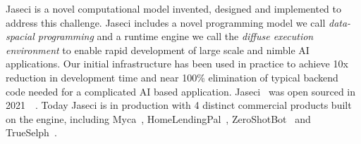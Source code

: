 Jaseci is a novel computational model invented, designed and implemented to address this challenge.
Jaseci includes a novel programming model we call \emph{data-spacial programming} and a runtime engine we call the \emph{diffuse execution environment} to enable rapid development of large scale and nimble AI applications.
Our initial infrastructure has been used in practice to achieve 10x reduction in development time and near 100\% elimination of typical backend code needed for a complicated AI based application.
Jaseci~\cite{jaseci-website} was open sourced in 2021~\cite{jaseci-github}~\cite{jaseci-pypi}.
Today Jaseci is in production with 4 distinct commercial products built on the engine, including Myca~\cite{myca-website}, HomeLendingPal~\cite{hlp-website},  ZeroShotBot~\cite{zsb-website} and TrueSelph~\cite{ts-website}.


